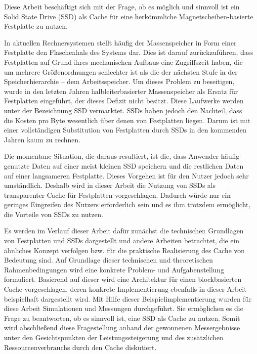 \pagestyle{empty}
\mbox{}\clearpage{}
\vspace*{5mm}
\begin{center}
\begin{minipage}{.8\textwidth}
\titleFont \large
\Author \newline
\titleFontBold \Large
\Title \newline
\titleFont \normalsize

\setlength{\parskip}{1em}

Diese Arbeit beschäftigt sich mit der Frage, ob es möglich und sinnvoll ist ein
Solid State Drive (SSD) als Cache für eine herkömmliche Magnetscheiben-basierte
Festplatte zu nutzen.

In aktuellen Rechnersystemen stellt häufig der Massenspeicher in Form einer
Festplatte den Flaschenhals des Systems dar. Dies ist darauf zurückzuführen,
dass Festplatten auf Grund ihres mechanischen Aufbaus eine Zugriffszeit haben,
die um mehrere Größenordnungen schlechter ist als die der nächsten Stufe in der
Speicherhierarchie -- dem Arbeitsspeicher. Um dieses Problem zu beseitigen,
wurde in den letzten Jahren halbleiterbasierter Massenspeicher als Ersatz für
Festplatten eingeführt, der dieses Defizit nicht besitzt. Diese Laufwerke werden
unter der Bezeichnung SSD vermarktet. SSDs haben jedoch den Nachteil, dass die
Kosten pro Byte wesentlich über denen von Festplatten liegen. Darum ist mit
einer vollständigen Substitution von Festplatten durch SSDs in den kommenden
Jahren kaum zu rechnen.

Die momentane Situation, die daraus resultiert, ist die, dass Anwender häufig
genutzte Daten auf einer meist kleinen SSD speichern und die restlichen Daten
auf einer langsameren Festplatte. Dieses Vorgehen ist für den Nutzer jedoch sehr
umständlich. Deshalb wird in dieser Arbeit die Nutzung von SSDs als
transparenter Cache für Festplatten vorgeschlagen. Dadurch würde nur ein
geringes Eingreifen des Nutzers erforderlich sein und es ihm trotzdem
ermöglicht, die Vorteile von SSDs zu nutzen.

Es werden im Verlauf dieser Arbeit dafür zunächst die technischen Grundlagen von
Festplatten und SSDs dargestellt und andere Arbeiten betrachtet, die ein
ähnliches Konzept verfolgen bzw. für die praktische Realisierung des Cache von
Bedeutung sind. Auf Grundlage dieser technischen und theoretischen
Rahmenbedingungen wird eine konkrete Problem- und Aufgabenstellung formuliert.
Basierend auf dieser wird eine Architektur für einen blockbasierten Cache
vorgeschlagen, deren konkrete Implementierung ebenfalls in dieser Arbeit
beispielhaft dargestellt wird. Mit Hilfe dieser Beispielimplementierung wurden
für diese Arbeit Simulationen und Messungen durchgeführt. Sie ermöglichen es die
Frage zu beantworten, ob es sinnvoll ist, eine SSD als Cache zu nutzen. Somit
wird abschließend diese Fragestellung anhand der gewonnenen Messergebnisse unter
den Gesichtspunkten der Leistungssteigerung und des zusätzlichen
Ressourcenverbrauchs durch den Cache diskutiert.

\end{minipage}
\end{center}
